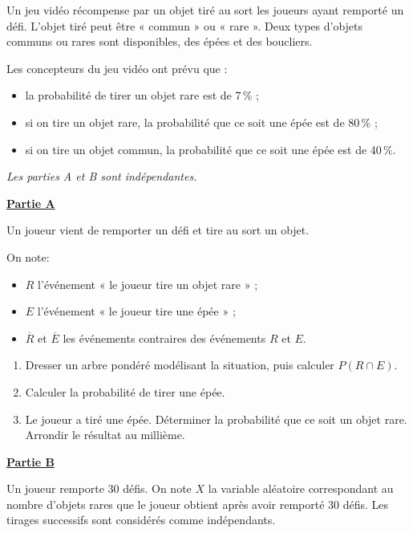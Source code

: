 Un jeu vidéo récompense par un objet tiré au sort les joueurs ayant remporté un défi. L'objet tiré peut être « commun » ou « rare ». Deux types d'objets communs ou rares sont disponibles, des épées et des boucliers.

\smallskip

Les concepteurs du jeu vidéo ont prévu que :

\begin{itemize}
	\item la probabilité de tirer un objet rare est de 7\,\% ;
	\item si on tire un objet rare, la probabilité que ce soit une épée est de 80\,\% ;
	\item si on tire un objet commun, la probabilité que ce soit une épée est de 40\,\%. 
\end{itemize}

\textit{Les parties A et B sont indépendantes.}

\medskip

\textbf{\large\underline{Partie A}}

\medskip

Un joueur vient de remporter un défi et tire au sort un objet.

On note:

\begin{itemize}
	\item $R$ l'événement « le joueur tire un objet rare » ;
	\item $E$ l'événement « le joueur tire une épée » ;
	\item $\overline{R}$ et $\overline{E}$ les événements contraires des événements $R$ et $E$.
\end{itemize}

\begin{enumerate}
	\item Dresser un arbre pondéré modélisant la situation, puis calculer $P(R \cap E)$.
	\item Calculer la probabilité de tirer une épée.
	\item Le joueur a tiré une épée. Déterminer la probabilité que ce soit un objet rare. Arrondir le résultat au millième.
\end{enumerate}

\textbf{\large\underline{Partie B}}

\medskip

Un joueur remporte 30 défis.
On note $X$ la variable aléatoire correspondant au nombre d'objets rares que le joueur obtient après avoir remporté 30 défis. Les tirages successifs sont considérés comme indépendants.

